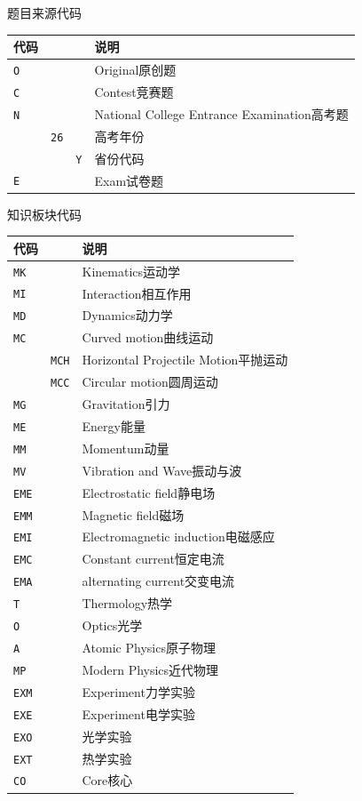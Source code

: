 题目来源代码

\begin{tabular}{lccl}
    \hline
    代码 &&& 说明 \\
    \hline
    \verb|O| &&& Original原创题\\
    \verb|C| &&& Contest竞赛题\\
    \verb|N| &&& National College Entrance Examination高考题\\
    &\verb|26|&& 高考年份\\
    &&\verb|Y|& 省份代码\\
    \verb|E| &&& Exam试卷题\\
    \hline
\end{tabular}

知识板块代码

\begin{tabular}{lcl}
    \hline
    代码 && 说明 \\
    \hline
    \verb|MK| && Kinematics运动学\\
    \verb|MI| && Interaction相互作用\\
    \verb|MD| && Dynamics动力学\\
    \verb|MC| && Curved motion曲线运动\\
    &\verb|MCH|&Horizontal Projectile Motion平抛运动\\
    &\verb|MCC|& Circular motion圆周运动\\
    \verb|MG| && Gravitation引力\\
    \verb|ME| && Energy能量\\
    \verb|MM| && Momentum动量\\
    \verb|MV| && Vibration and Wave振动与波\\ 
    \verb|EME| && Electrostatic field静电场\\
    \verb|EMM| && Magnetic field磁场\\
    \verb|EMI| && Electromagnetic induction电磁感应\\
    \verb|EMC| && Constant current恒定电流\\
    \verb|EMA| && alternating current交变电流\\
    \verb|T| && Thermology热学\\
    \verb|O| && Optics光学\\
    \verb|A| && Atomic Physics原子物理\\
    \verb|MP| && Modern Physics近代物理\\
    \verb|EXM| && Experiment力学实验\\
    \verb|EXE| && Experiment电学实验\\
    \verb|EXO| && 光学实验\\
    \verb|EXT| && 热学实验\\
    \verb|CO| &&Core核心\\
    \hline
\end{tabular}


